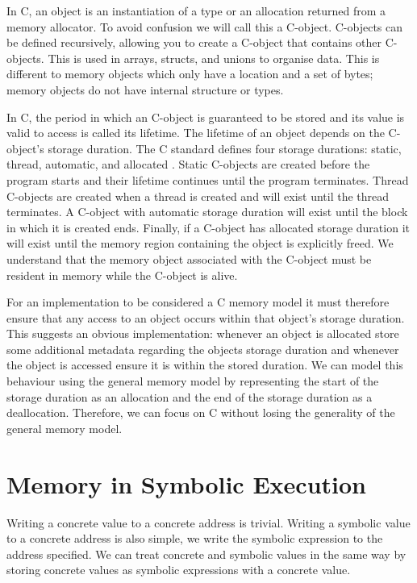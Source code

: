 \documentclass[12pt,twoside]{report}
\begin{document}
In C, an object is an instantiation of a type or an allocation returned from a memory allocator. To avoid confusion we will call this a C-object. C-objects can be defined recursively, allowing you to create a C-object that contains other C-objects. This is used in arrays, structs, and unions to organise data. This is different to memory objects which only have a location and a set of bytes; memory objects do not have internal structure or types.

In C, the period in which an C-object is guaranteed to be stored and its value is valid to access is called its lifetime. The lifetime of an object depends on the C-object's storage duration. The C standard defines four storage durations: static, thread, automatic, and allocated \cite{ISO/IEC-9899:2018}. Static C-objects are created before the program starts and their lifetime continues until the program terminates. Thread C-objects are created when a thread is created and will exist until the thread terminates. A C-object with automatic storage duration will exist until the block in which it is created ends. Finally, if a C-object has allocated storage duration it will exist until the memory region containing the object is explicitly freed. We understand that the memory object associated with the C-object must be resident in memory while the C-object is alive.

For an implementation to be considered a C memory model it must therefore ensure that any access to an object occurs within that object's storage duration. This suggests an obvious implementation: whenever an object is allocated store some additional metadata regarding the objects storage duration and whenever the object is accessed ensure it is within the stored duration. We can model this behaviour using the general memory model by representing the start of the storage duration as an allocation and the end of the storage duration as a deallocation. Therefore, we can focus on C without losing the generality of the general memory model.

\section{Memory in Symbolic Execution}
Writing a concrete value to a concrete address is trivial. Writing a symbolic value to a concrete address is also simple, we write the symbolic expression to the address specified. We can treat concrete and symbolic values in the same way by storing concrete values as symbolic expressions with a concrete value.
\end{document}
